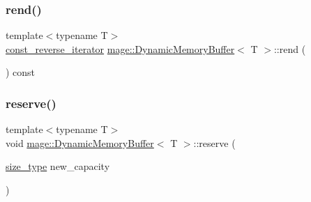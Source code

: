 \mbox{\label{classmage_1_1_dynamic_memory_buffer_aeaa0d8a54ce2d0279658f46dceea679a}} 
\subsubsection{\texorpdfstring{rend()}{rend()}\hspace{0.1cm}{\footnotesize\ttfamily [2/2]}}
{\footnotesize\ttfamily template$<$typename T$>$ \\
\mbox{\hyperlink{classmage_1_1_dynamic_memory_buffer_a962256bdb2b82436843d71ade7e4d7ee}{const\+\_\+reverse\+\_\+iterator}} \mbox{\hyperlink{classmage_1_1_dynamic_memory_buffer}{mage\+::\+Dynamic\+Memory\+Buffer}}$<$ T $>$\+::rend (\begin{DoxyParamCaption}{ }\end{DoxyParamCaption}) const\hspace{0.3cm}{\ttfamily [noexcept]}}

\mbox{\label{classmage_1_1_dynamic_memory_buffer_ada4cea21561e02a8fe29e3da1462c678}} 
\subsubsection{\texorpdfstring{reserve()}{reserve()}}
{\footnotesize\ttfamily template$<$typename T$>$ \\
void \mbox{\hyperlink{classmage_1_1_dynamic_memory_buffer}{mage\+::\+Dynamic\+Memory\+Buffer}}$<$ T $>$\+::reserve (\begin{DoxyParamCaption}\item[{\mbox{\hyperlink{classmage_1_1_dynamic_memory_buffer_a45d02825da2b18fd7c24965ed5f46a30}{size\+\_\+type}}}]{new\+\_\+capacity }\end{DoxyParamCaption})}

\mbox{\label{classmage_1_1_dynamic_memory_buffer_a516a63af722f07dc01df704a4ab0ff43}} 
